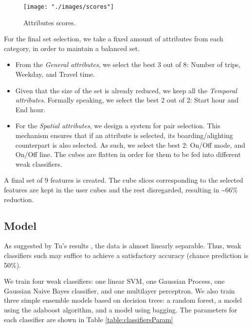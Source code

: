\documentclass{article}
\begin{document}
\begin{figure}[H]
  \centering
  \texttt{[image: "./images/scores"]}
  \caption{Attributes scores.}
  \label{fig:classification/scores}
\end{figure}

For the final set selection, we take a fixed amount of attributes from each category, in order to maintain a balanced set. 

\begin{itemize}

\item From the \textit{General attributes}, we select the best 3 out of 8: Number of trips, Weekday, and Travel time. 

\item Given that the size of the set is already reduced, we keep all the \textit{Temporal attributes}. Formally speaking, we select the best 2 out of 2: Start hour and End hour. 

\item For the \textit{Spatial attributes}, we design a system for pair selection. This mechanism ensures that if an attribute is selected, its boarding/alighting counterpart is also selected. As such, we select the best 2: On/Off mode, and On/Off line. The cubes are flatten in order for them to be fed into different weak classifiers. 

\end{itemize}

A final set of 9 features is created. The cube slices corresponding to the selected features are kept in the user cubes and the rest disregarded, resulting in \textasciitilde 66\% reduction. 

\subsection{Model} 
As suggested by Tu's results \cite{tu2016impact}, the data is almost linearly separable. Thus, weak classifiers such may suffice to achieve a satisfactory accuracy (chance prediction is 50\%).

We train four weak classifiers: one linear SVM, one Gaussian Process, one Gaussian Naive Bayes classifier, and one multilayer perceptron. We also train three simple ensemble models based on decision trees: a random forest, a model using the adaboost algorithm, and a model using bagging. The parameters for each classifier are shown in Table \ref{table:classifiersParam}
\end{document}
